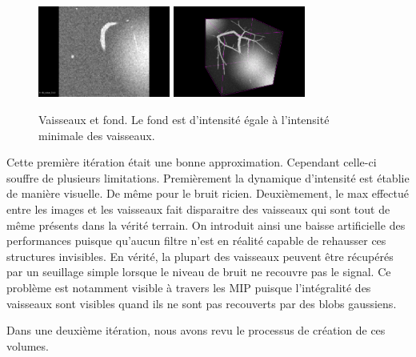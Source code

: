 \begin{figure}
  \centering
  \includegraphics[height=3cm]{Images/2D_VBIR10.png}
  \includegraphics[height=3cm]{Images/3D_VBIR10.png}
  \label{fig:2D_VB}
  \caption{Vaisseaux et fond. Le fond est d'intensité égale à l'intensité minimale des vaisseaux.}
\end{figure}

Cette première itération était une bonne approximation. Cependant celle-ci souffre de plusieurs limitations. Premièrement la dynamique d'intensité est établie de manière visuelle. De même pour le bruit ricien. Deuxièmement, le max effectué entre les images et les vaisseaux fait disparaitre des vaisseaux qui sont tout de même présents dans la vérité terrain. On introduit ainsi une baisse artificielle des performances puisque qu'aucun filtre n'est en réalité capable de rehausser ces structures invisibles. En vérité, la plupart des vaisseaux peuvent être récupérés par un seuillage simple lorsque le niveau de bruit ne recouvre pas le signal. Ce problème est notamment visible à travers les MIP puisque l'intégralité des vaisseaux sont visibles quand ils ne sont pas recouverts par des blobs gaussiens.

Dans une deuxième itération, nous avons revu le processus de création de ces volumes.

